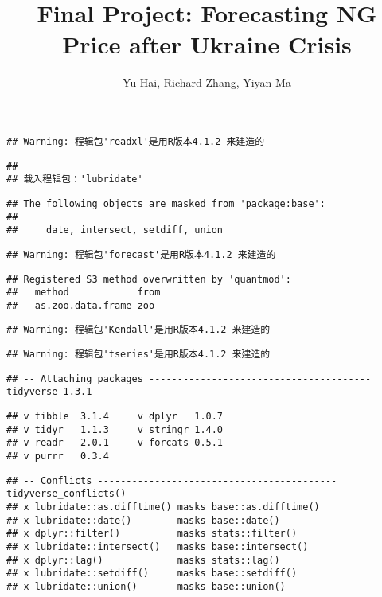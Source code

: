 \documentclass[
]{article}
\title{Final Project: Forecasting NG Price after Ukraine Crisis}
\author{Yu Hai, Richard Zhang, Yiyan Ma}
\date{}
\begin{document}
\maketitle

\begin{verbatim}
## Warning: 程辑包'readxl'是用R版本4.1.2 来建造的
\end{verbatim}

\begin{verbatim}
## 
## 载入程辑包：'lubridate'
\end{verbatim}

\begin{verbatim}
## The following objects are masked from 'package:base':
## 
##     date, intersect, setdiff, union
\end{verbatim}

\begin{verbatim}
## Warning: 程辑包'forecast'是用R版本4.1.2 来建造的
\end{verbatim}

\begin{verbatim}
## Registered S3 method overwritten by 'quantmod':
##   method            from
##   as.zoo.data.frame zoo
\end{verbatim}

\begin{verbatim}
## Warning: 程辑包'Kendall'是用R版本4.1.2 来建造的
\end{verbatim}

\begin{verbatim}
## Warning: 程辑包'tseries'是用R版本4.1.2 来建造的
\end{verbatim}

\begin{verbatim}
## -- Attaching packages --------------------------------------- tidyverse 1.3.1 --
\end{verbatim}

\begin{verbatim}
## v tibble  3.1.4     v dplyr   1.0.7
## v tidyr   1.1.3     v stringr 1.4.0
## v readr   2.0.1     v forcats 0.5.1
## v purrr   0.3.4
\end{verbatim}

\begin{verbatim}
## -- Conflicts ------------------------------------------ tidyverse_conflicts() --
## x lubridate::as.difftime() masks base::as.difftime()
## x lubridate::date()        masks base::date()
## x dplyr::filter()          masks stats::filter()
## x lubridate::intersect()   masks base::intersect()
## x dplyr::lag()             masks stats::lag()
## x lubridate::setdiff()     masks base::setdiff()
## x lubridate::union()       masks base::union()
\end{verbatim}
\end{document}
